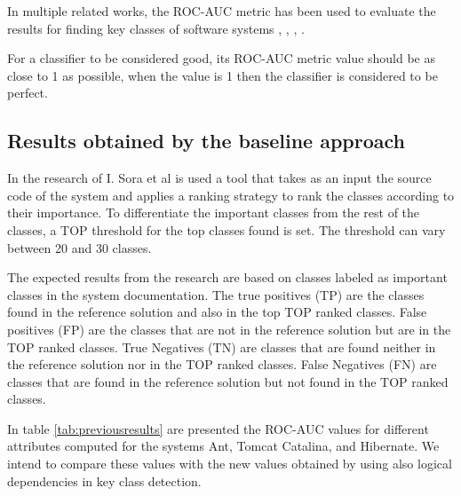 \documentclass[12pt]{mitthesis}
\begin{document}
In multiple related works, the ROC-AUC metric has been used to evaluate the results for finding key classes of software systems \cite{6676885}, \cite{Finding-key-classes}, \cite{rocclasification}, \cite{7551990}.

For a classifier to be considered good, its ROC-AUC metric value should be as close to 1 as possible, when the value is 1 then the classifier is considered to be perfect.

\subsection{Results obtained by the baseline approach}
\label{sec:previous_measurements}

In the research of I. Sora et al \cite{Finding-key-classes} is used a tool that takes as an input the source code of the system and applies a ranking strategy to rank the classes according to their importance. To differentiate the important classes from the rest of the classes, a TOP threshold for the top classes found is set. The threshold can vary between 20 and 30 classes.

The expected results from the research are based on classes labeled as important classes in the system documentation.
The true positives (TP) are the classes found in the reference solution and also in the top TOP ranked classes. False positives (FP) are the classes that are not in the reference solution but are in the TOP ranked classes.
True Negatives (TN) are classes that are found neither in the reference solution nor in the TOP ranked classes. False Negatives (FN) are classes that are found in the reference solution but not found in the TOP ranked classes.

In table \ref{tab:previousresults} are presented the ROC-AUC values for different attributes computed for the systems Ant, Tomcat Catalina, and Hibernate. We intend to compare these values with the new values obtained by using also logical dependencies in key class detection.

\begin{table}[!h]
\renewcommand{\arraystretch}{1}
\caption{ROC-AUC metric values extracted. }
\label{tab:previousresults}
\centering
{}
\end{table}
\end{document}
